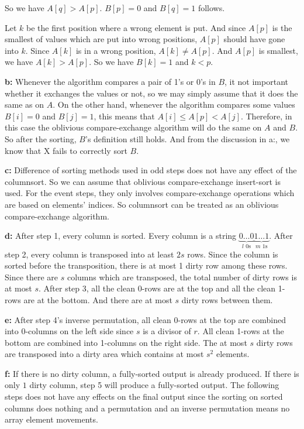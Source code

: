 \documentclass{book}
\begin{document}
\begin{CJK}{UTF8}{gkai}
So we have $A[q] > A[p]$.  $B[p] = 0$ and $B[q] = 1$ follows. 

Let $k$ be the first position where a wrong element is put. And since $A[p]$ is 
the smallest of values which are put into wrong positions, $A[p]$ should have 
gone into $k$. Since $A[k]$ is in a wrong position, $A[k] \neq A[p]$. And $A[p]$ 
is smallest, we have $A[k] > A[p]$. So we have $B[k] = 1$ and $k < p$.

\textbf{b:} Whenever the algorithm compares a pair of 1's or 0's in $B$, it not 
important whether it exchanges the values or not, so we may simply assume that 
it does the same as on $A$. On the other hand, whenever the algorithm compares 
some values $B[i]=0$ and $B[j]=1$, this means that $A[i] \le A[p] < A[j]$.  
Therefore, in this case the oblivious compare-exchange algorithm will do the 
same on $A$ and $B$. So after the sorting, $B$'s definition still holds. And 
from the discussion in a:, we know that X fails to correctly sort $B$.

\textbf{c:} Difference of sorting methods used in odd steps does not have any 
effect of the columnsort. So we can assume that oblivious compare-exchange 
insert-sort is used. For the event steps, they only involves compare-exchange 
operations which are based on elements' indices. So columnsort can be treated as 
an oblivious compare-exchange algorithm.

\textbf{d:} After step 1, every column is sorted. Every column is a string 
$\underbrace{0\dots0}_\text{$l$ 0s}\underbrace{1\dots1}_\text{$m$ 1s}$. After 
step 2, every column is transposed into at least $2s$ rows. Since the column is 
sorted before the transposition, there is at most 1 dirty row among these rows.  
Since there are $s$ columns which are transposed, the total number of dirty rows 
is at most $s$. After step 3, all the clean 0-rows are at the top and all the 
clean 1-rows are at the bottom. And there are at most $s$ dirty rows between 
them.

\textbf{e:} After step 4's inverse permutation, all clean 0-rows at the top are 
combined into 0-columns on the left side since $s$ is a divisor of $r$. All 
clean 1-rows at the bottom are combined into 1-columns on the right side. The at 
most $s$ dirty rows are transposed into a dirty area which contains at most 
$s^2$ elements.

\textbf{f:} If there is no dirty column, a fully-sorted output is already 
produced.  If there is only $1$ dirty column, step 5 will produce a fully-sorted 
output.  The following steps does not have any effects on the final output since 
the sorting on sorted columns does nothing and a permutation and an inverse 
permutation means no array element movements.


\end{CJK}
\end{document}
